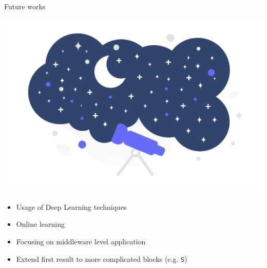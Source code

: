 \begin{frame}{\playfairblack Future works}
  \begin{backgroundblock} 
    \includegraphics[width=\paperwidth]{img/conclusion.pdf} 
  \end{backgroundblock} 
  \begin{card}
    \begin{itemize}  
      \item Usage of Deep Learning techniques
      \item Online learning
      \item Focusing on middleware level application
      \item Extend first result to more complicated blocks (e.g. \texttt{S})
    \end{itemize}
  \end{card}
\end{frame}
